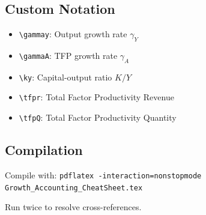 \documentclass[a4paper,11pt]{article}
\newcommand{\gammay}{\gamma_Y}
\newcommand{\gammaA}{\gamma_A}
\newcommand{\tfpQ}{A}
\newcommand{\tfpr}{TFPR}
\newcommand{\ky}{\frac{K}{Y}}
\begin{document}
\subsection*{Custom Notation}
\begin{itemize}
    \item \verb|\gammay|: Output growth rate $\gamma_Y$
    \item \verb|\gammaA|: TFP growth rate $\gamma_A$
    \item \verb|\ky|: Capital-output ratio $K/Y$
    \item \verb|\tfpr|: Total Factor Productivity Revenue
    \item \verb|\tfpQ|: Total Factor Productivity Quantity
\end{itemize}

\subsection*{Compilation}
Compile with: \texttt{pdflatex -interaction=nonstopmode Growth\_Accounting\_CheatSheet.tex}

Run twice to resolve cross-references.
\end{document}

